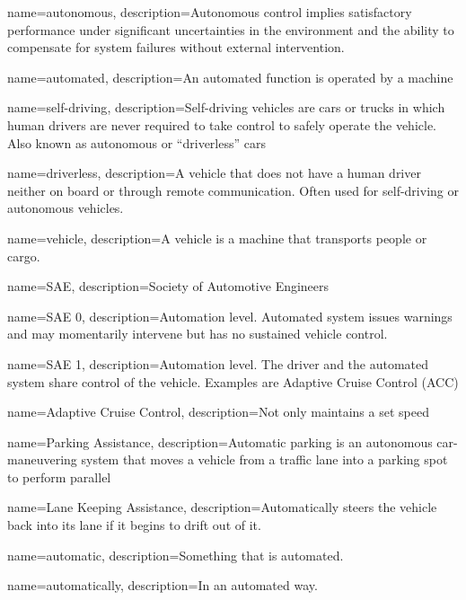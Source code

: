 {%
	name={autonomous},
	description={Autonomous control implies satisfactory performance under
	significant uncertainties in the environment and the ability to
	compensate for system failures without external intervention.}
}

{%
	name={automated},
	description={An automated function is operated by a machine}
}

{%
	name={self-driving},
	description={Self-driving vehicles are cars or trucks in which human
	drivers are never required to take control to safely operate the
	vehicle. Also known as autonomous or “driverless” cars}
}

{%
	name={driverless},
	description={A vehicle that does not have a human driver neither on
	board or through remote communication. Often used for self-driving or
	autonomous vehicles.}
}

{%
	name={vehicle},
	description={A vehicle is a machine that transports people or cargo.}
}

{%
	name={SAE},
	description={Society of Automotive Engineers}
}

{%
	name={SAE 0},
	description={Automation level. Automated system issues warnings and may
	momentarily intervene but has no sustained vehicle control.}
}

{%
	name={SAE 1},
	description={Automation level. The driver and the automated system share
	control of the vehicle. Examples are Adaptive Cruise Control (ACC)}
}

{%
	name={Adaptive Cruise Control},
	description={Not only maintains a set speed}
}

{%
	name={Parking Assistance},
	description={Automatic parking is an autonomous car-maneuvering system
	that moves a vehicle from a traffic lane into a parking spot to perform
	parallel}
}

{%
	name={Lane Keeping Assistance},
	description={Automatically steers the vehicle back into its lane if it
	begins to drift out of it.}
}

{%
	name={automatic},
	description={Something that is automated.}
}

{%
	name={automatically},
	description={In an automated way.}
}

